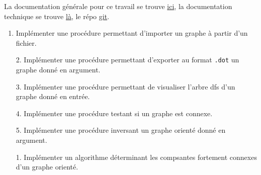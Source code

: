 \documentclass[10pt]{article} %
\begin{document}
\vspace{1cm}

La documentation générale pour ce travail se trouve \href{https://polytech-sorbonne-main-tp2.readthedocs.io/en/latest/}{ici}, la documentation
technique se trouve \href{https://ejovo13.github.io/DSA_TP1/}{là}, le répo \href{https://github.com/ejovo13/DSA_TP1}{git}.

\vspace{1cm}
\noindent {} 

\begin{enumerate}
    \item Implémenter une procédure permettant d'importer un graphe à partir d'un fichier.
\end{enumerate}

\begin{itemize}
    \item [2.] Implémenter une procédure permettant d'exporter au format \texttt{.dot} un graphe donné en argument.
\end{itemize}

\begin{itemize}
    \item [3.] Implémenter une procédure permettant de visualiser l'arbre dfs d'un graphe donné en entrée.
\end{itemize}

\begin{itemize}
    \item [4.] Implémenter une procédure testant si un graphe est connexe.
\end{itemize}

\begin{itemize}
    \item [5.] Implémenter une procédure inversant un graphe orienté donné en argument.
\end{itemize}

\vspace{.5cm}
\noindent {} 

\begin{itemize}
    \item [1.] Implémenter un algorithme déterminant les compsantes fortement connexes d'un graphe orienté.
\end{itemize}
\end{document}
